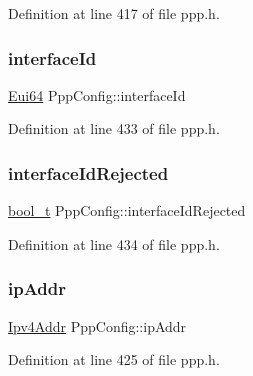 Definition at line 417 of file ppp.\+h.

\mbox{\label{structPppConfig_ae6c52269b209ba51baac4f58357456f8}} 
\subsubsection{\texorpdfstring{interface\+Id}{interfaceId}}
{\footnotesize\ttfamily \hyperlink{ethernet_8h_acbcae3afd042b3ce97e42f54013c8137}{Eui64} Ppp\+Config\+::interface\+Id}



Definition at line 433 of file ppp.\+h.

\mbox{\label{structPppConfig_aede61e90dffb9365e98e1301e4c3f273}} 
\subsubsection{\texorpdfstring{interface\+Id\+Rejected}{interfaceIdRejected}}
{\footnotesize\ttfamily \hyperlink{compiler__port_8h_a812d16e5494522586b3784e55d479912}{bool\+\_\+t} Ppp\+Config\+::interface\+Id\+Rejected}



Definition at line 434 of file ppp.\+h.

\mbox{\label{structPppConfig_af660facff4e0e42d8a58b59a50fee065}} 
\subsubsection{\texorpdfstring{ip\+Addr}{ipAddr}}
{\footnotesize\ttfamily \hyperlink{ipv4_8h_a411debb3d770caa0c06d3f73367da37f}{Ipv4\+Addr} Ppp\+Config\+::ip\+Addr}



Definition at line 425 of file ppp.\+h.

\mbox{\label{structPppConfig_ae86961aa0868a5627e6431cefa5f2a3d}} 
